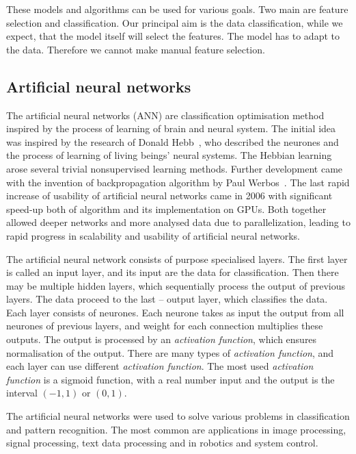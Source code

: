 \documentclass[
    digital,    %
    oneside,    %
    color,
    11pt,
    nocover,
    notable,
    nolof,
    nolot,
]{fithesis3}
\begin{document}
These models and algorithms can be used for various goals. Two main are feature selection and classification. Our principal aim is the data classification, while we expect, that the model itself will select the features. The model has to adapt to the data. Therefore we cannot make manual feature selection.

\subsection{Artificial neural networks}
\label{subsec:opt-other-ann}

The artificial neural networks (ANN) are classification optimisation method inspired by the process of learning of brain and neural system. The initial idea was inspired by the research of Donald Hebb~\cite{hebb49learning}, who described the neurones and the process of learning of living beings' neural systems. The Hebbian learning arose several trivial nonsupervised learning methods. Further development came with the invention of backpropagation algorithm by Paul Werbos~\cite{werbos75beyondThesis}. The last rapid increase of usability of artificial neural networks came in 2006 with significant speed-up both of algorithm and its implementation on GPUs. Both together allowed deeper networks and more analysed data due to parallelization, leading to rapid progress in scalability and usability of artificial neural networks.

The artificial neural network consists of purpose specialised layers. The first layer is called an input layer, and its input are the data for classification. Then there may be multiple hidden layers, which sequentially process the output of previous layers. The data proceed to the last -- output layer, which classifies the data. Each layer consists of neurones. Each neurone takes as input the output from all neurones of previous layers, and weight for each connection multiplies these outputs. The output is processed by an \textit{activation function}, which ensures normalisation of the output. There are many types of \textit{activation function}, and each layer can use different \textit{activation function}. The most used \textit{activation function} is a sigmoid function, with a real number input and the output is the interval $(-1, 1)$ or $(0, 1)$.

The artificial neural networks were used to solve various problems in classification and pattern recognition. The most common are applications in image processing, signal processing, text data processing and in robotics and system control.
\end{document}
